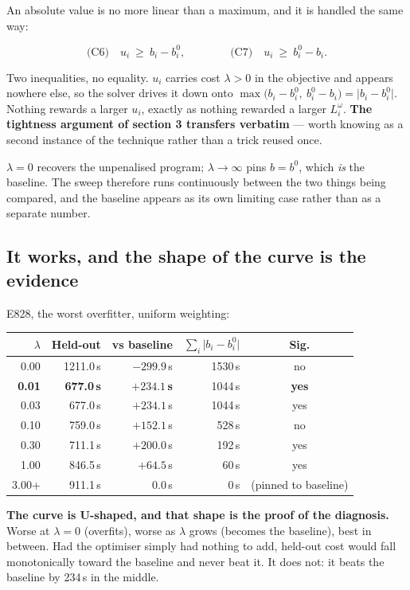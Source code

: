 \documentclass[11pt,a4paper]{article}
\begin{document}
An absolute value is no more linear than a maximum, and it is handled the same way:

\[
\text{(C6)}\quad u_i \ \ge\ b_i - b_i^0, \qquad\qquad \text{(C7)}\quad u_i \ \ge\ b_i^0 - b_i .
\]

Two inequalities, no equality. $u_i$ carries cost $\lambda > 0$ in the objective and appears
nowhere else, so the solver drives it down onto
$\max\bigl(b_i - b_i^0,\ b_i^0 - b_i\bigr) = \lvert b_i - b_i^0 \rvert$. Nothing rewards a
larger $u_i$, exactly as nothing rewarded a larger $L_i^\omega$. \textbf{The tightness
argument of section 3 transfers verbatim} --- worth knowing as a second instance of the
technique rather than a trick reused once.

$\lambda = 0$ recovers the unpenalised program; $\lambda \to \infty$ pins $b = b^0$, which
\emph{is} the baseline. The sweep therefore runs continuously between the two things being
compared, and the baseline appears as its own limiting case rather than as a separate number.

\subsection*{It works, and the shape of the curve is the evidence}

E828, the worst overfitter, uniform weighting:

\begin{center}
\begin{tabular}{@{}rrrrc@{}}
\toprule
$\lambda$ & \textbf{Held-out} & \textbf{vs baseline} & $\sum_i \lvert b_i - b_i^0\rvert$ & \textbf{Sig.} \\
\midrule
0.00 & 1211.0\,s & $-299.9$\,s & 1530\,s & no \\
\textbf{0.01} & \textbf{677.0\,s} & $\mathbf{+234.1}$\,\textbf{s} & 1044\,s & \textbf{yes} \\
0.03 & 677.0\,s & $+234.1$\,s & 1044\,s & yes \\
0.10 & 759.0\,s & $+152.1$\,s & 528\,s & no \\
0.30 & 711.1\,s & $+200.0$\,s & 192\,s & yes \\
1.00 & 846.5\,s & $+64.5$\,s & 60\,s & yes \\
3.00+ & 911.1\,s & 0.0\,s & 0\,s & (pinned to baseline) \\
\bottomrule
\end{tabular}
\end{center}

\begin{keybox}
\textbf{The curve is U-shaped, and that shape is the proof of the diagnosis.} Worse at
$\lambda = 0$ (overfits), worse as $\lambda$ grows (becomes the baseline), best in between.
Had the optimiser simply had nothing to add, held-out cost would fall monotonically toward
the baseline and never beat it. It does not: it beats the baseline by 234\,s in the middle.
\end{keybox}
\end{document}

